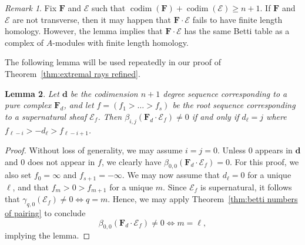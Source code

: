 \documentclass[12pt]{amsart}
\newtheorem{lemma}{Lemma}[section]
\theoremstyle{definition}
\theoremstyle{remark}
\newtheorem{remark}[lemma]{Remark}
\newcommand{\codim}{\operatorname{codim}}
\newcommand{\dd}{\mathbf{d}}
\newcommand{\cE}{\mathcal{E}}
\newcommand{\FF}{\mathbf{F}}
\begin{document}
\begin{remark}
Fix $\FF$ and $\cE$ such that $\codim(\FF)+\codim(\cE)\geq n+1$.  If $\FF$ and $\cE$ are not transverse, then it may happen that $\FF\cdot \cE$ fails to have finite length homology. However, the lemma implies that $\FF\cdot \cE$ has the same Betti table as a complex of $A$-modules with finite length homology.  
\end{remark}

The following lemma will be used repeatedly in our proof of Theorem~\ref{thm:extremal rays refined}.
\begin{lemma}\label{lem:pure and supernatural}
Let $\dd$ be the codimension $n+1$ degree sequence corresponding to a pure complex $\FF_d$, and let $f=(f_1>\dots >f_s)$ be the root sequence corresponding to a supernatural sheaf $\cE_f$.  Then
$
\beta_{i,j}(\FF_d\cdot \cE_f)\ne 0
$
if and only if $d_\ell=j$ where $f_{\ell-i}>-d_{\ell}>f_{\ell-i+1}$.\end{lemma}
\begin{proof}
Without loss of generality, we may assume $i=j=0$.  Unless $0$ appears in $\dd$ and $0$ does not appear in $f$, we clearly have $\beta_{0,0}(\FF_d\cdot \cE_f)=0$.  For this proof, we also set $f_0=\infty$ and $f_{s+1}=-\infty$. We may now assume that $d_{\ell}=0$ for a unique $\ell$, and that $f_m>0>f_{m+1}$ for a unique $m$.
Since $\cE_f$ is supernatural, it follows that $\gamma_{q,0}(\cE_f)\ne 0 \iff q=m$.  Hence, we may apply Theorem~\ref{thm:betti numbers of pairing} to conclude
\[
\beta_{0,0}(\FF_d\cdot \cE_f)\ne 0 \iff m=\ell,
\]
implying the lemma.
\end{proof}
\end{document}
